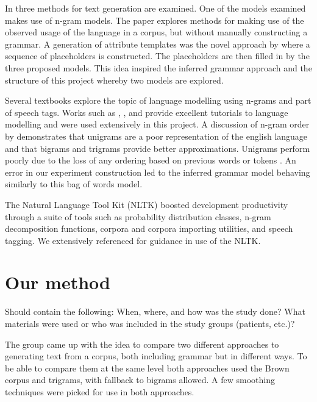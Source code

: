 \documentclass[a4paper,12pt]{article}
\begin{document}
In \cite{Ratnaparkhi00} three methods for text generation are examined. One of the models examined makes use of n-gram models. The paper explores methods for making use of the observed usage of the language in a corpus, but without manually constructing a grammar. A generation of attribute templates was the novel approach by \cite{Ratnaparkhi00} where a sequence of placeholders is constructed. The placeholders are then filled in by the three proposed models. This idea inspired the inferred grammar approach and the structure of this project whereby two models are explored.

Several textbooks explore the topic of language modelling using n-grams and part of speech tags. Works such as \cite{Jurafsky2000}, \cite{RussellNorvigAIBook3rd}, and \cite{Chen98anempirical} provide excellent tutorials to language modelling and were used extensively in this project. A discussion of n-gram order by \cite{RussellNorvigAIBook3rd} demonstrates that unigrams are a poor representation of the english language and that bigrams and trigrams provide better approximations. Unigrams perform poorly due to the loss of any ordering based on previous words or tokens \cite{RussellNorvigAIBook3rd}. An error in our experiment construction led to the inferred grammar model behaving similarly to this bag of words model.

The Natural Language Tool Kit (NLTK) boosted development productivity through a suite of tools such as probability distribution classes, n-gram decomposition functions, corpora and corpora importing utilities, and speech tagging. We extensively referenced \cite{NLTKBook09} for guidance in use of the NLTK. 

\section{Our method}
\label{sec:method}

Should contain the following: When, where, and how was the study done? What materials were used or who was included in the study groups (patients, etc.)?


The group came up with the idea to compare two different approaches to generating text from a corpus, both including grammar but in different ways. To be able to compare them at the same level both approaches used the Brown corpus and trigrams, with fallback to bigrams allowed. A few smoothing techniques were picked for use in both approaches.
\end{document}
